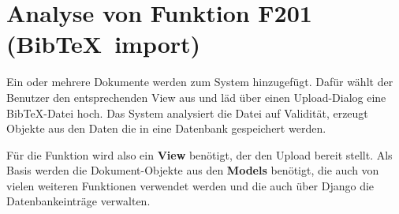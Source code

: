 \section{Analyse von Funktion F201 (Bib\TeX\ import)}
Ein oder mehrere Dokumente werden zum System hinzugefügt. Dafür wählt der
Benutzer den entsprechenden View aus und läd über einen Upload-Dialog eine
Bib\TeX -Datei hoch. Das System analysiert die Datei auf Validität, erzeugt
Objekte aus den Daten die in eine Datenbank gespeichert werden.

Für die Funktion wird also ein \textbf{View} benötigt, der den Upload bereit
stellt.  Als Basis werden die Dokument-Objekte aus den \textbf{Models} benötigt,
die auch von vielen weiteren Funktionen verwendet werden und die auch über
Django die Datenbankeinträge verwalten.
